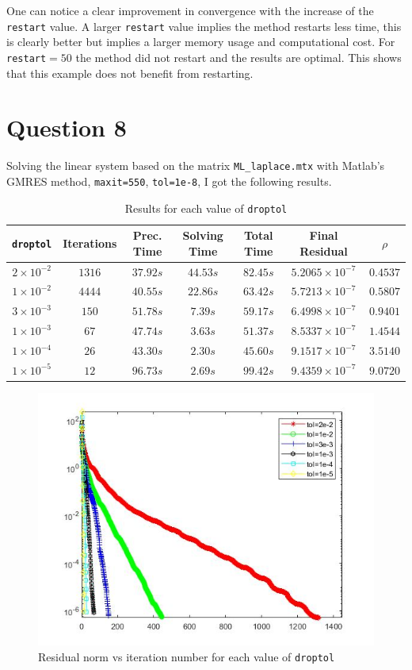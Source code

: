 \documentclass[a4paper, 11pt]{article}
\begin{document}
			One can notice a clear improvement in convergence with the increase of the \texttt{restart} value.
			A larger \texttt{restart} value implies the method restarts less time, this is clearly better but implies a larger memory usage and computational cost.
			For \texttt{restart}$ = 50 $ the method did not restart and the results are optimal.
			This shows that this example does not benefit from restarting.
		
		\section*{Question 8}
			Solving the linear system based on the matrix \texttt{ML\_laplace.mtx} with Matlab's GMRES method, \texttt{maxit=550}, \texttt{tol=1e-8}, I got the following results.
			
			\begin{table}[H]
				\centering
				\begin{tabular}{c|c|c|c|c|c|c}
					\textbf{\texttt{droptol}} & \textbf{Iterations} & \textbf{Prec. Time}  & \textbf{Solving Time}  & \textbf{Total Time} & \textbf{Final Residual} & \textbf{$ \rho $} \\ \hline
					$2 \times 10^{-2}$ & $1316$	& $ 37.92 s $ 	& $ 44.53 s $ & $ 82.45 s $ 	& $ 5.2065 \times 10^{-7} $ & $ 0.4537 $\\ \hline
					$1 \times 10^{-2}$ & $4444$	& $ 40.55 s $ 	& $ 22.86 s $ & $ 63.42 s $ 	& $ 5.7213 \times 10^{-7} $ & $ 0.5807 $\\ \hline
					$3 \times 10^{-3}$ & $150$	& $ 51.78 s $ 	& $ 7.39 s $ & $ 59.17 s $ 		& $ 6.4998 \times 10^{-7} $ & $ 0.9401 $\\ \hline
					$1 \times 10^{-3}$ & $67$	& $ 47.74 s $ 	& $ 3.63 s $ & $ 51.37 s $ 		& $ 8.5337 \times 10^{-7} $ & $ 1.4544 $\\ \hline
					$1 \times 10^{-4}$ & $26$	& $ 43.30 s $ 	& $ 2.30 s $ & $ 45.60 s $ 		& $ 9.1517 \times 10^{-7} $ & $ 3.5140 $\\ \hline
					$1 \times 10^{-5}$ & $12$	& $ 96.73 s $ 	& $ 2.69 s $ & $ 99.42 s $ 		& $ 9.4359 \times 10^{-7} $ & $ 9.0720 $\\ \hline
				\end{tabular}
				\caption{Results for each value of \texttt{droptol}}
				\label{table:ex8}
			\end{table}
			
			\begin{figure}[H]
				\centering
				\includegraphics[width=.6\linewidth]{ex8.jpg}
				\caption{Residual norm vs iteration number for each value of \texttt{droptol}}
				\label{fig:ex8}
			\end{figure}
		
\end{document}
